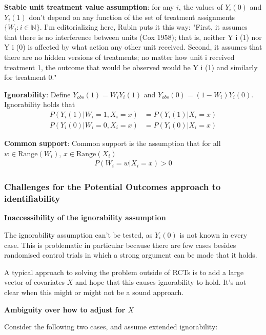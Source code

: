 \textbf{Stable unit treatment value assumption}: for any $i$, the values of $Y_i(0)$ and $Y_i(1)$ don't depend on any function of the set of treatment assignments $\{W_i:i\in\mathbb{N}\}$. I'm editorializing here, Rubin puts it this way: "First, it assumes that there is no interference between units (Cox 1958); that is, neither Y i (1) nor Y i (0) is affected by what action any other unit received. Second, it assumes that there are no hidden versions of treatments; no matter how unit i received treatment 1, the outcome that would be observed would be Y i (1) and similarly for treatment 0." 

\textbf{Ignorability}: Define $Y_{obs}(1)=W_i Y_i(1)$ and $Y_{obs}(0)= (1-W_i)Y_i(0)$. Ignorability holds that \begin{align}
    P(Y_i(1)|W_i=1,X_i=x) &= P(Y_i(1)|X_i=x) \\
    P(Y_i(0)|W_i=0,X_i=x) &= P(Y_i(0)|X_i=x)
\end{align}

\textbf{Common support}: Common support is the assumption that for all $w\in \mathrm{Range}(W_i)$, $x\in \mathrm{Range}(X_i)$
\begin{align}
    P(W_i=w|X_i=x) > 0
\end{align}

\subsubsection{Challenges for the Potential Outcomes approach to identifiability}

\textbf{Inaccessibility of the ignorability assumption}

The ignorability assumption can't be tested, as $Y_i(0)$ is not known in every case. This is problematic in particular because there are few cases besides randomised control trials in which a strong argument can be made that it holds.

A typical approach to solving the problem outside of RCTs is to add a large vector of covariates $X$ and hope that this causes ignorability to hold. It's not clear when this might or might not be a sound approach.

\textbf{Ambiguity over how to adjust for $X$}

Consider the following two cases, and assume extended ignorability:

\begin{center}
\end{center}


